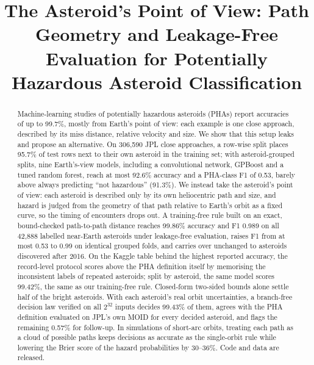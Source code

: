 \documentclass[conference]{IEEEtran}
\begin{document}
\title{The Asteroid's Point of View: Path Geometry and Leakage-Free Evaluation for Potentially Hazardous Asteroid Classification}

\author{
\and
{}
}

\maketitle

\begin{abstract}
Machine-learning studies of potentially hazardous asteroids (PHAs) report accuracies of up to 99.7\%, mostly from Earth's point of view: each example is one close approach, described by its miss distance, relative velocity and size. We show that this setup leaks and propose an alternative. On 306,590 JPL close approaches, a row-wise split places 95.7\% of test rows next to their own asteroid in the training set; with asteroid-grouped splits, nine Earth's-view models, including a convolutional network, GPBoost and a tuned random forest, reach at most 92.6\% accuracy and a PHA-class F1 of 0.53, barely above always predicting ``not hazardous'' (91.3\%). We instead take the asteroid's point of view: each asteroid is described only by its own heliocentric path and size, and hazard is judged from the geometry of that path relative to Earth's orbit as a fixed curve, so the timing of encounters drops out. A training-free rule built on an exact, bound-checked path-to-path distance reaches 99.86\% accuracy and F1 0.989 on all 42,888 labelled near-Earth asteroids under leakage-free evaluation, raises F1 from at most 0.53 to 0.99 on identical grouped folds, and carries over unchanged to asteroids discovered after 2016. On the Kaggle table behind the highest reported accuracy, the record-level protocol scores above the PHA definition itself by memorising the inconsistent labels of repeated asteroids; split by asteroid, the same model scores 99.42\%, the same as our training-free rule. Closed-form two-sided bounds alone settle half of the bright asteroids. With each asteroid's real orbit uncertainties, a branch-free decision law verified on all $2^{32}$ inputs decides 99.43\% of them, agrees with the PHA definition evaluated on JPL's own MOID for every decided asteroid, and flags the remaining 0.57\% for follow-up. In simulations of short-arc orbits, treating each path as a cloud of possible paths keeps decisions as accurate as the single-orbit rule while lowering the Brier score of the hazard probabilities by 30--36\%. Code and data are released.
\end{abstract}
\end{document}
